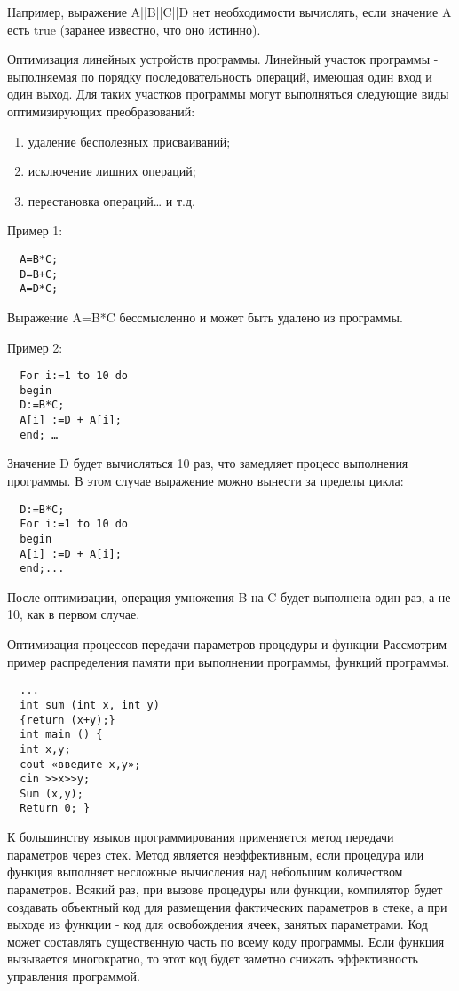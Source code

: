 Например, выражение A||B||C||D нет необходимости вычислять, если значение A есть true (заранее известно, что оно истинно).

Оптимизация линейных устройств программы. Линейный участок программы - выполняемая по порядку последовательность операций, имеющая один вход и один выход. Для таких участков программы могут выполняться следующие виды оптимизирующих преобразований:

\begin{enumerate}
  \item удаление бесполезных присваиваний;
  \item исключение лишних операций;
  \item перестановка операций… и т.д.
\end{enumerate}

Пример 1:

\begin{verbatim}
  A=B*C;
  D=B+C;
  A=D*C;
\end{verbatim}

Выражение A=B*C бессмысленно и может быть удалено из программы.

Пример 2:

\begin{verbatim}
  For i:=1 to 10 do
  begin
  D:=B*С;
  A[i] :=D + A[i];
  end; …
\end{verbatim}

Значение D будет вычисляться 10 раз, что замедляет процесс выполнения программы. В этом случае выражение можно вынести за пределы цикла:

\begin{verbatim}
  D:=B*С;
  For i:=1 to 10 do
  begin
  A[i] :=D + A[i];
  end;...
\end{verbatim}

После оптимизации, операция умножения B на C будет выполнена один раз, а не 10, как в первом случае.

Оптимизация процессов передачи параметров процедуры и функции
Рассмотрим пример распределения памяти при выполнении программы, функций программы.

\begin{verbatim}
  ...
  int sum (int x, int y)
  {return (x+y);}
  int main () {
  int x,y;
  cout «введите x,y»;
  cin >>x>>y;
  Sum (x,y);
  Return 0; }
\end{verbatim}

К большинству языков программирования применяется метод передачи параметров через стек. Метод является неэффективным, если процедура или функция выполняет несложные вычисления над небольшим количеством параметров. Всякий раз, при вызове процедуры или функции, компилятор будет создавать объектный код для размещения фактических параметров в стеке, а при выходе из функции - код для освобождения ячеек, занятых параметрами. Код может составлять существенную часть по всему коду программы. Если функция вызывается многократно, то этот код будет заметно снижать эффективность управления программой.

